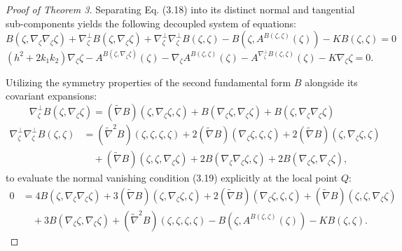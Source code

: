 \documentclass [reqno]{amsart}
\theoremstyle{plain}
\numberwithin{equation}{section}
\begin{document}
\begin{proof}[Proof of Theorem 3]
Separating Eq. (3.18) into its distinct normal and tangential sub-components yields the following decoupled system of equations:
\begin{equation}
B(\zeta,\nabla_\zeta \nabla_\zeta \zeta)+\nabla_\zeta^\perp B(\zeta,\nabla_\zeta \zeta)+\nabla_\zeta^\perp \nabla_\zeta^\perp B(\zeta,\zeta)-B(\zeta,A^{B(\zeta,\zeta)}(\zeta))-KB(\zeta,\zeta)=0
\end{equation}
\begin{equation}
(h^2+2k_1 k_2)\nabla_\zeta \zeta-A^{B(\zeta,\nabla_\zeta \zeta)}(\zeta)-\nabla_\zeta A^{B(\zeta,\zeta)}(\zeta)-A^{\nabla_\zeta^\perp B(\zeta,\zeta)}(\zeta)-K\nabla_\zeta \zeta=0.
\end{equation}

Utilizing the symmetry properties of the second fundamental form $B$ alongside its covariant expansions:
\begin{equation}
\nabla_\zeta^\perp B(\zeta,\nabla_\zeta \zeta)=(\tilde{\nabla} B)(\zeta,\nabla_\zeta \zeta,\zeta)+B(\nabla_\zeta \zeta,\nabla_\zeta \zeta)+B(\zeta,\nabla_\zeta \nabla_\zeta \zeta)
\end{equation}
\begin{equation}
\begin{aligned}
\nabla_\zeta^\perp \nabla_\zeta^\perp B(\zeta,\zeta) &= (\tilde{\nabla}^2 B)(\zeta,\zeta,\zeta,\zeta)+2(\tilde{\nabla} B)(\nabla_\zeta \zeta,\zeta,\zeta)+2(\tilde{\nabla} B)(\zeta,\nabla_\zeta \zeta,\zeta) \\
&\quad +(\tilde{\nabla} B)(\zeta,\zeta,\nabla_\zeta \zeta)+2B(\nabla_\zeta \nabla_\zeta \zeta,\zeta)+2B(\nabla_\zeta \zeta,\nabla_\zeta \zeta),
\end{aligned}
\end{equation}
to evaluate the normal vanishing condition (3.19) explicitly at the local point $Q$:
\begin{equation}
\begin{aligned}
0 &= 4B(\zeta,\nabla_\zeta \nabla_\zeta \zeta)+3(\tilde{\nabla} B)(\zeta,\nabla_\zeta \zeta,\zeta)+2(\tilde{\nabla} B)(\nabla_\zeta \zeta,\zeta,\zeta)+(\tilde{\nabla} B)(\zeta,\zeta,\nabla_\zeta \zeta) \\
&\quad +3B(\nabla_\zeta \zeta,\nabla_\zeta \zeta)+(\tilde{\nabla}^2 B)(\zeta,\zeta,\zeta,\zeta)-B(\zeta,A^{B(\zeta,\zeta)}(\zeta))-KB(\zeta,\zeta).
\end{aligned}
\end{equation}


\end{proof}
\end{document}
